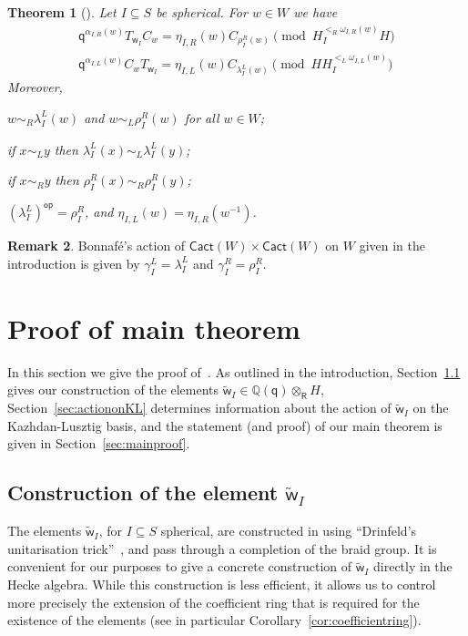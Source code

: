 \documentclass[11pt]{article}
\theoremstyle{plain}
\newtheorem{thm}{Theorem}[section]
\theoremstyle{definition}
\newtheorem{remark}[thm]{Remark}
\numberwithin{equation}{section}
\def\tw{\widetilde{\mathsf{w}}_I}
\def\cact{\mathsf{Cact}}
\newcommand{\la}{\lambda}
\def\QQ{\mathbb{Q}}
\def\la{\lambda}
\def\la{\lambda}
\def\sR{\mathsf{R}}
\newcommand{\sw}{\mathsf{w}}
\newcommand{\sq}{\mathsf{q}}
\begin{document}
\begin{thm}[{\cite[Corollaries~4.7 and 4.10]{Bon:16}}]\label{thm:bonnafe}
Let $I\subseteq S$ be spherical. For $w\in W$ we have
\begin{align*}
\sq^{\alpha_{I,R}(w)}T_{\sw_I}C_w=\eta_{I,R}(w)C_{\rho_I^R(w)}\pmod{H_I^{<_R\omega_{I,R}(w)}H}\\
\sq^{\alpha_{I,L}(w)}C_wT_{\sw_I}=\eta_{I,L}(w)C_{\la_I^L(w)}\pmod{HH_I^{<_L\omega_{I,L}(w)}}
\end{align*}
Moreover, 
\begin{compactenum}[$(1)$]
\item $w\sim_R\la_I^L(w)$ and $w\sim_L\rho_I^R(w)$ for all $w\in W$;
\item if $x\sim_L y$ then $\la_I^L(x)\sim_L\la_I^L(y)$;
\item if $x\sim_R y$ then $\rho_I^R(x)\sim_R \rho_I^R(y)$;
\item $(\la_I^L)^{\mathsf{op}}=\rho_I^R$, and $\eta_{I,L}(w)=\eta_{I,R}(w^{-1})$. 
\end{compactenum}
\end{thm}



\begin{remark}\label{rem:bonnafeaction}
Bonnaf\'e's action of $\cact(W)\times\cact(W)$ on $W$ given in the introduction is given by $\gamma_I^L=\la_I^L$ and $\gamma_I^R=\rho_I^R$. 
\end{remark}


\section{Proof of main theorem}

In this section we give the proof of~\cite[Conjecture~4.2]{RW:24}. As outlined in the introduction, Section~\ref{sec:concrete} gives our construction of the elements $\tw\in\QQ(\sq)\otimes_{\sR}H$, Section~\ref{sec:actiononKL} determines information about the action of $\tw$ on the Kazhdan-Lusztig basis, and the statement (and proof) of our main theorem is given in Section~\ref{sec:mainproof}. 

\subsection{Construction of the element $\tw$}\label{sec:concrete}

The elements $\tw$, for $I\subseteq S$ spherical, are constructed in \cite{EHKR:10,RW:24} using ``Drinfeld's unitarisation trick''~\cite{Dr:90}, and pass through a completion of the braid group. It is convenient for our purposes to give a concrete construction of $\tw$ directly in the Hecke algebra. While this construction is less efficient, it allows us to control more precisely the extension of the coefficient ring that is required for the existence of the elements (see in particular Corollary~\ref{cor:coefficientring}).
\end{document}
